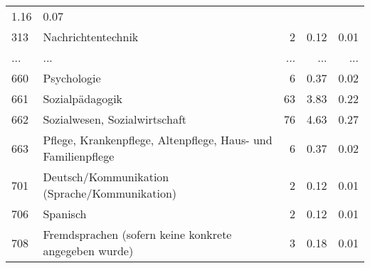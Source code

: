\begin{longtable}{lXrrr}
          \num[round-mode=places,round-precision=2]{1,16} &
          \num[round-mode=places,round-precision=2]{0,07} \\
        313 & \multicolumn{1}{X}{Nachrichtentechnik} & %
          \num{2} &
          \num[round-mode=places,round-precision=2]{0,12} &
          \num[round-mode=places,round-precision=2]{0,01} \\
       ... & ... & ... & ... & ... \\
        660 & \multicolumn{1}{X}{Psychologie} & %
          \num{6} &
          \num[round-mode=places,round-precision=2]{0,37} &
          \num[round-mode=places,round-precision=2]{0,02} \\

        661 & \multicolumn{1}{X}{Sozialpädagogik} & %
          \num{63} &
          \num[round-mode=places,round-precision=2]{3,83} &
          \num[round-mode=places,round-precision=2]{0,22} \\

        662 & \multicolumn{1}{X}{Sozialwesen, Sozialwirtschaft} & %
          \num{76} &
          \num[round-mode=places,round-precision=2]{4,63} &
          \num[round-mode=places,round-precision=2]{0,27} \\

        663 & \multicolumn{1}{X}{Pflege, Krankenpflege, Altenpflege, Haus- und Familienpflege} & %
          \num{6} &
          \num[round-mode=places,round-precision=2]{0,37} &
          \num[round-mode=places,round-precision=2]{0,02} \\

        701 & \multicolumn{1}{X}{Deutsch/Kommunikation (Sprache/Kommunikation)} & %
          \num{2} &
          \num[round-mode=places,round-precision=2]{0,12} &
          \num[round-mode=places,round-precision=2]{0,01} \\

        706 & \multicolumn{1}{X}{Spanisch} & %
          \num{2} &
          \num[round-mode=places,round-precision=2]{0,12} &
          \num[round-mode=places,round-precision=2]{0,01} \\

        708 & \multicolumn{1}{X}{Fremdsprachen (sofern keine konkrete angegeben wurde)} & %
          \num{3} &
          \num[round-mode=places,round-precision=2]{0,18} &
          \num[round-mode=places,round-precision=2]{0,01} \\


\end{longtable}
